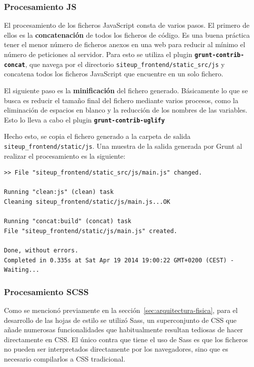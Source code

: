 \subsubsection{Procesamiento JS}

El procesamiento de los ficheros JavaScript consta de varios pasos. El primero
de ellos es la \textbf{concatenación} de todos los ficheros de código. Es una
buena práctica tener el menor número de ficheros anexos en una web para reducir
al mínimo el número de peticiones al servidor. Para esto se utiliza el plugin
\textbf{\texttt{grunt-contrib-concat}}, que navega por el directorio
\texttt{siteup\_frontend/static\_src/js} y concatena todos los ficheros
JavaScript que encuentre en un solo fichero.

El siguiente paso es la \textbf{minificación} del fichero generado. Básicamente
lo que se busca es reducir el tamaño final del fichero mediante varios procesos,
como la eliminación de espacios en blanco y la reducción de los nombres de las
variables. Esto lo lleva a cabo el plugin \textbf{\texttt{grunt-contrib-uglify}}

Hecho esto, se copia el fichero generado a la carpeta de salida
\texttt{siteup\_frontend/static/js}. Una muestra de la salida generada por Grunt
al realizar el procesamiento es la siguiente:

\begin{verbatim}
>> File "siteup_frontend/static_src/js/main.js" changed.

Running "clean:js" (clean) task
Cleaning siteup_frontend/static/js/main.js...OK

Running "concat:build" (concat) task
File "siteup_frontend/static/js/main.js" created.

Done, without errors.
Completed in 0.335s at Sat Apr 19 2014 19:00:22 GMT+0200 (CEST) - Waiting...
\end{verbatim}

\subsubsection{Procesamiento SCSS}

Como se mencionó previamente en la sección~\ref{sec:arquitectura-fisica},
para el desarrollo de las hojas de estilo se utilizó Sass, un superconjunto de
CSS que añade numerosas funcionalidades que habitualmente resultan tediosas de
hacer directamente en CSS. El único contra que tiene el uso de Sass es que los
ficheros no pueden ser interpretados directamente por los navegadores, sino que
es necesario compilarlos a CSS tradicional.

